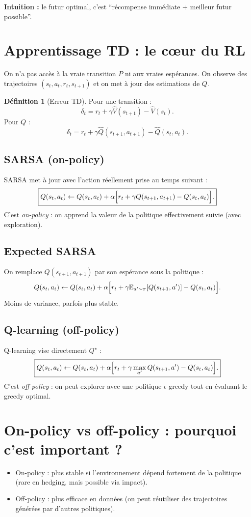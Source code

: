\documentclass[11pt,a4paper]{report}
\newcommand{\E}{\mathbb{E}}
\newcommand{\1}{\mathbbm{1}}
\theoremstyle{definition}
\newtheorem{definition}{Définition}[chapter]
\theoremstyle{plain}
\theoremstyle{remark}
\begin{document}
\textbf{Intuition :}
le futur optimal, c'est ``récompense immédiate + meilleur futur possible''.

\section{Apprentissage TD : le cœur du RL}
\label{sec:td}

On n'a pas accès à la vraie transition $P$ ni aux vraies espérances.
On observe des trajectoires $(s_t,a_t,r_t,s_{t+1})$ et on met à jour des estimations de $Q$.

\begin{definition}[Erreur TD]
Pour une transition :
\[
\delta_t = r_t + \gamma \widehat{V}(s_{t+1}) - \widehat{V}(s_t).
\]
Pour $Q$ :
\[
\delta_t = r_t + \gamma \widehat{Q}(s_{t+1},a_{t+1}) - \widehat{Q}(s_t,a_t).
\]
\end{definition}

\subsection{SARSA (on-policy)}
SARSA met à jour avec l'action réellement prise au temps suivant :
\[
\boxed{
Q(s_t,a_t)\leftarrow Q(s_t,a_t) + \alpha\Bigl[r_t + \gamma Q(s_{t+1},a_{t+1}) - Q(s_t,a_t)\Bigr].
}
\]
C'est \emph{on-policy} : on apprend la valeur de la politique effectivement suivie (avec exploration).

\subsection{Expected SARSA}
On remplace $Q(s_{t+1},a_{t+1})$ par son espérance sous la politique :
\[
Q(s_t,a_t)\leftarrow Q(s_t,a_t) + \alpha\Bigl[r_t + \gamma \E_{a'\sim\pi}[Q(s_{t+1},a')] - Q(s_t,a_t)\Bigr].
\]
Moins de variance, parfois plus stable.

\subsection{Q-learning (off-policy)}
Q-learning vise directement $Q^\star$ :
\[
\boxed{
Q(s_t,a_t)\leftarrow Q(s_t,a_t) + \alpha\Bigl[r_t + \gamma \max_{a'}Q(s_{t+1},a') - Q(s_t,a_t)\Bigr].
}
\]
C'est \emph{off-policy} : on peut explorer avec une politique $\epsilon$-greedy
tout en évaluant le greedy optimal.

\section{On-policy vs off-policy : pourquoi c'est important ?}
\begin{itemize}
  \item On-policy : plus stable si l'environnement dépend fortement de la politique (rare en hedging, mais possible via impact).
  \item Off-policy : plus efficace en données (on peut réutiliser des trajectoires générées par d'autres politiques).
\end{itemize}
\end{document}
